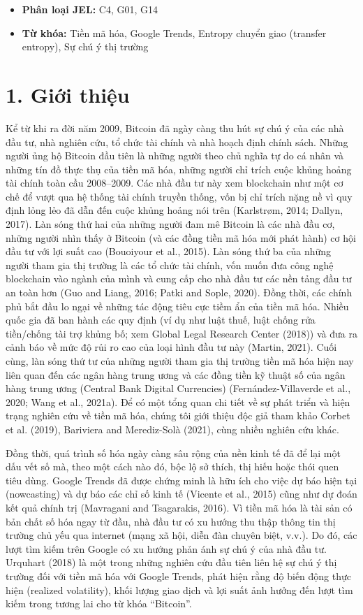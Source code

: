 \begin{itemize}
  \item \textbf{Phân loại JEL:} C4, G01, G14
  \item \textbf{Từ khóa:} Tiền mã hóa, Google Trends, Entropy chuyển giao (transfer entropy), Sự chú ý thị trường
\end{itemize}

\section{1. Giới thiệu}

Kể từ khi ra đời năm 2009, Bitcoin đã ngày càng thu hút sự chú ý của các nhà đầu tư, nhà nghiên cứu, tổ chức tài chính và nhà hoạch định chính sách. Những người ủng hộ Bitcoin đầu tiên là những người theo chủ nghĩa tự do cá nhân và những tín đồ thực thụ của tiền mã hóa, những người chỉ trích cuộc khủng hoảng tài chính toàn cầu 2008--2009. Các nhà đầu tư này xem blockchain như một cơ chế để vượt qua hệ thống tài chính truyền thống, vốn bị chỉ trích nặng nề vì quy định lỏng lẻo đã dẫn đến cuộc khủng hoảng nói trên (Karlstrøm, 2014; Dallyn, 2017). Làn sóng thứ hai của những người đam mê Bitcoin là các nhà đầu cơ, những người nhìn thấy ở Bitcoin (và các đồng tiền mã hóa mới phát hành) cơ hội đầu tư với lợi suất cao (Bouoiyour et al., 2015). Làn sóng thứ ba của những người tham gia thị trường là các tổ chức tài chính, vốn muốn đưa công nghệ blockchain vào ngành của mình và cung cấp cho nhà đầu tư các nền tảng đầu tư an toàn hơn (Guo and Liang, 2016; Patki and Sople, 2020). Đồng thời, các chính phủ bắt đầu lo ngại về những tác động tiêu cực tiềm ẩn của tiền mã hóa. Nhiều quốc gia đã ban hành các quy định (ví dụ như luật thuế, luật chống rửa tiền/chống tài trợ khủng bố; xem Global Legal Research Center (2018)) và đưa ra cảnh báo về mức độ rủi ro cao của loại hình đầu tư này (Martin, 2021). Cuối cùng, làn sóng thứ tư của những người tham gia thị trường tiền mã hóa hiện nay liên quan đến các ngân hàng trung ương và các đồng tiền kỹ thuật số của ngân hàng trung ương (Central Bank Digital Currencies) (Fernández-Villaverde et al., 2020; Wang et al., 2021a). Để có một tổng quan chi tiết về sự phát triển và hiện trạng nghiên cứu về tiền mã hóa, chúng tôi giới thiệu độc giả tham khảo Corbet et al. (2019), Bariviera and Merediz-Solà (2021), cùng nhiều nghiên cứu khác.

Đồng thời, quá trình số hóa ngày càng sâu rộng của nền kinh tế đã để lại một dấu vết số mà, theo một cách nào đó, bộc lộ sở thích, thị hiếu hoặc thói quen tiêu dùng. Google Trends đã được chứng minh là hữu ích cho việc dự báo hiện tại (nowcasting) và dự báo các chỉ số kinh tế (Vicente et al., 2015) cũng như dự đoán kết quả chính trị (Mavragani and Tsagarakis, 2016). Vì tiền mã hóa là tài sản có bản chất số hóa ngay từ đầu, nhà đầu tư có xu hướng thu thập thông tin thị trường chủ yếu qua internet (mạng xã hội, diễn đàn chuyên biệt, v.v.). Do đó, các lượt tìm kiếm trên Google có xu hướng phản ánh sự chú ý của nhà đầu tư. Urquhart (2018) là một trong những nghiên cứu đầu tiên liên hệ sự chú ý thị trường đối với tiền mã hóa với Google Trends, phát hiện rằng độ biến động thực hiện (realized volatility), khối lượng giao dịch và lợi suất ảnh hưởng đến lượt tìm kiếm trong tương lai cho từ khóa ``Bitcoin''.

